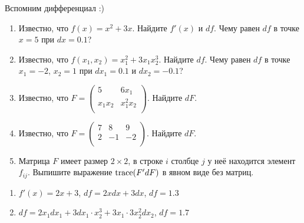 \begin{problem}
    Вспомним дифференциал :)
    \begin{enumerate}
        \item Известно, что $f(x) = x^2 + 3x$. Найдите $f'(x)$ и $df$. Чему равен $df$ в точке $x=5$ при $dx=0.1$?
        \item Известно, что $f(x_1, x_2)=x_1^2 + 3x_1x_2^3$. Найдите $df$. Чему равен $df$ в точке $x_1=-2$, $x_2=1$ при $dx_1=0.1$ и $dx_2=-0.1$?
        \item Известно, что $F=\begin{pmatrix}
                5 & 6x_1 \\
                x_1x_2 & x_1^2x_2 \\
            \end{pmatrix}$. Найдите $dF$.
        \item Известно, что $F=\begin{pmatrix}
                7 & 8 & 9 \\
                2 & -1 & -2 \\
            \end{pmatrix}$. Найдите $dF$.
        \item Матрица $F$ имеет размер $2\times 2$, в строке $i$ столбце $j$ у неё находится элемент $f_{ij}$.
            Выпишите выражение $\operatorname{trace}(F'dF)$ в явном виде без матриц.
    \end{enumerate}
\begin{sol}
\begin{enumerate}
\item $f'(x) = 2x + 3$, $df = 2xdx + 3dx$, $df = 1.3$
\item $df = 2 x_1 d x_1 + 3 d x_1 \cdot x_2^3 + 3x_1 \cdot 3 x_2^2 dx_2$, $df = 1.7$
\end{enumerate}
\end{sol}
\end{problem}



